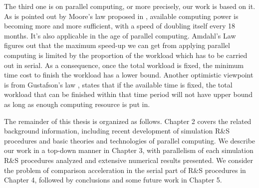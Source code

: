 The third one is on parallel computing, or more precisely, our work is based on it. As is pointed out by Moore's law proposed in \cite{moore}, available computing power is becoming more and more sufficient, with a speed of doubling itself every 18 months. It's also applicable in the age of parallel computing. Amdahl's Law \cite{amdahl} figures out that the maximum speed-up we can get from applying parallel computing is limited by the proportion of the workload which has to be carried out in serial. As a consequence, once the total workload is fixed, the minimum time cost to finish the workload has a lower bound. Another optimistic viewpoint is from Gustafson's law \cite{gustafson}, states that if the available time is fixed, the total workload that can be finished within that time period will not have upper bound as long as enough computing resource is put in.

The remainder of this thesis is organized as follows. Chapter 2 covers the related background information, including recent development of simulation R\&S procedures and basic theories and technologies of parallel computing. We describe our work in a top-down manner in Chapter 3, with parallelism of each simulation R\&S procedures analyzed and extensive numerical results presented. We consider the problem of comparison acceleration in the serial part of R\&S procedures in Chapter 4, followed by conclusions and some future work in Chapter 5.
